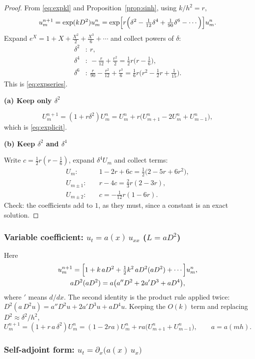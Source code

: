 \documentclass[11pt,a4paper]{article}
\numberwithin{equation}{section}
\theoremstyle{spacedplain}
\theoremstyle{spaceddefinition}
\theoremstyle{spacedremark}
\newcommand{\step}[1]{\par\addvspace{0.6em}\noindent\textbf{#1}\par\nobreak}
\begin{document}
\begin{proof}
From \eqref{eq:expkl} and Proposition~\ref{prop:sinh}, using
\(k/h^2=r\),
\[
  u_m^{n+1}=\exp(kD^2)u_m^n
  =\exp\Bigl[r\Bigl(\delta^2-\tfrac1{12}\delta^4+\tfrac1{90}\delta^6
   -\cdots\Bigr)\Bigr]u_m^n.
\]
Expand \(e^X=1+X+\frac{X^2}{2}+\frac{X^3}{6}+\cdots\) and collect
powers of \(\delta\):
\begin{align*}
  \delta^2&:\ r,\\
  \delta^4&:\ -\tfrac{r}{12}+\tfrac{r^2}{2}=\tfrac12r\bigl(r-\tfrac16\bigr),\\
  \delta^6&:\ \tfrac{r}{90}-\tfrac{r^2}{12}+\tfrac{r^3}{6}
    =\tfrac16r\bigl(r^2-\tfrac12r+\tfrac1{15}\bigr).
\end{align*}
This is \eqref{eq:expseries}.

\step{(a) Keep only \(\delta^2\)}

\[
  U_m^{n+1}=(1+r\delta^2)U_m^n
  =U_m^n+r\bigl(U_{m+1}^n-2U_m^n+U_{m-1}^n\bigr),
\]
which is \eqref{eq:explicit}.

\step{(b) Keep \(\delta^2\) and \(\delta^4\)}
Write
\(c=\frac12r(r-\frac16)\), expand \(\delta^4U_m\) and collect terms:
\begin{align*}
  U_m:&\quad 1-2r+6c=\tfrac12\bigl(2-5r+6r^2\bigr),\\
  U_{m\pm1}:&\quad r-4c=\tfrac23r(2-3r),\\
  U_{m\pm2}:&\quad c=-\tfrac1{12}r(1-6r).
\end{align*}
Check: the coefficients add to \(1\), as they must, since a constant is
an exact solution.
\end{proof}

\subsubsection*{Variable coefficient: \(u_t=a(x)\,u_{xx}\) (\(L=aD^2\))}

Here
\[
\begin{gathered}
  u_m^{n+1}=\Bigl[1+k\,aD^2+\tfrac12k^2\,aD^2(aD^2)+\cdots\Bigr]u_m^n,
  \\
  aD^2(aD^2)=a\bigl(a''D^2+2a'D^3+aD^4\bigr),
\end{gathered}
\]
where \('\) means \(d/dx\).  The second identity is the product rule
applied twice: \(D^2(a\,D^2u)=a''D^2u+2a'D^3u+aD^4u\).  Keeping the
\(O(k)\) term and replacing \(D^2\approx\delta^2/h^2\),
\[
  U_m^{n+1}=(1+r\,a\,\delta^2)U_m^n
  =\boxed{(1-2ra)U_m^n+ra\bigl(U_{m+1}^n+U_{m-1}^n\bigr)},
  \qquad a=a(mh).
\]

\subsubsection*{Self-adjoint form: \(u_t=\partial_x\bigl(a(x)\,u_x\bigr)\)}
\end{document}
